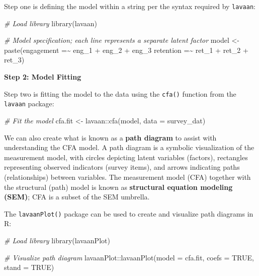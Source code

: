 \documentclass[
]{book}
\newenvironment{Shaded}{\begin{snugshade}}{\end{snugshade}}
\newcommand{\AttributeTok}[1]{\textcolor[rgb]{0.77,0.63,0.00}{#1}}
\newcommand{\CommentTok}[1]{\textcolor[rgb]{0.56,0.35,0.01}{\textit{#1}}}
\newcommand{\ConstantTok}[1]{\textcolor[rgb]{0.00,0.00,0.00}{#1}}
\newcommand{\FunctionTok}[1]{\textcolor[rgb]{0.00,0.00,0.00}{#1}}
\newcommand{\NormalTok}[1]{#1}
\newcommand{\OtherTok}[1]{\textcolor[rgb]{0.56,0.35,0.01}{#1}}
\newcommand{\SpecialCharTok}[1]{\textcolor[rgb]{0.00,0.00,0.00}{#1}}
\newcommand{\StringTok}[1]{\textcolor[rgb]{0.31,0.60,0.02}{#1}}
\begin{document}
Step one is defining the model within a string per the syntax required by \texttt{lavaan}:

\begin{Shaded}
\begin{Highlighting}[]
\CommentTok{\# Load library}
\FunctionTok{library}\NormalTok{(lavaan)}

\CommentTok{\# Model specification; each line represents a separate latent factor}
\NormalTok{model }\OtherTok{\textless{}{-}} \FunctionTok{paste}\NormalTok{(}\StringTok{\textquotesingle{}engagement =\textasciitilde{} eng\_1 + eng\_2 + eng\_3}
\StringTok{                retention =\textasciitilde{} ret\_1 + ret\_2 + ret\_3\textquotesingle{}}\NormalTok{)}
\end{Highlighting}
\end{Shaded}

\textbf{Step 2: Model Fitting}

Step two is fitting the model to the data using the \texttt{cfa()} function from the \texttt{lavaan} package:

\begin{Shaded}
\begin{Highlighting}[]
\CommentTok{\# Fit the model}
\NormalTok{cfa.fit }\OtherTok{\textless{}{-}}\NormalTok{ lavaan}\SpecialCharTok{::}\FunctionTok{cfa}\NormalTok{(model, }\AttributeTok{data =}\NormalTok{ survey\_dat)}
\end{Highlighting}
\end{Shaded}

We can also create what is known as a \textbf{path diagram} to assist with understanding the CFA model. A path diagram is a symbolic visualization of the measurement model, with circles depicting latent variables (factors), rectangles representing observed indicators (survey items), and arrows indicating paths (relationships) between variables. The measurement model (CFA) together with the structural (path) model is known as \textbf{structural equation modeling (SEM)}; CFA is a subset of the SEM umbrella.

The \texttt{lavaanPlot()} package can be used to create and visualize path diagrams in R:

\begin{Shaded}
\begin{Highlighting}[]
\CommentTok{\# Load library}
\FunctionTok{library}\NormalTok{(lavaanPlot)}

\CommentTok{\# Visualize path diagram}
\NormalTok{lavaanPlot}\SpecialCharTok{::}\FunctionTok{lavaanPlot}\NormalTok{(}\AttributeTok{model =}\NormalTok{ cfa.fit, }\AttributeTok{coefs =} \ConstantTok{TRUE}\NormalTok{, }\AttributeTok{stand =} \ConstantTok{TRUE}\NormalTok{)}
\end{Highlighting}
\end{Shaded}
\end{document}
